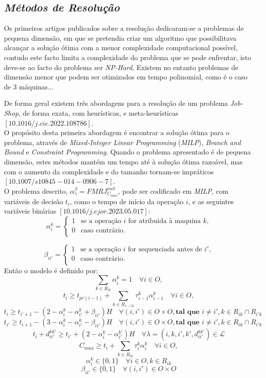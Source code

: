 \subsection{\textit{Métodos de Resolução}}
\label{subsec:MR}

Os primeiros artigos publicados sobre a resolução dedicaram-se a problemas de pequena dimensão, em que se pretendia criar um algoritmo que possibilitava alcançar a solução ótima com a menor complexidade computacional possível, contudo este facto limita a complexidade do problema que se pode enfrentar, isto deve-se ao facto do problema ser \textit{NP-Hard}. Existem no entanto problemas de dimensão menor que podem ser otimizados em tempo polinomial, como é o caso de 3 máquinas...

De forma geral existem três abordagens para a resolução de um problema \textit{Job-Shop}, de forma exata, com heurísticas, e meta-heurísticas $[10.1016/j.cie.2022.108786]$.\\
O propósito desta primeira abordagem é encontrar a solução ótima para o problema, através de \textit{Mixed-Integer Linear Programming} (\textit{MILP}), \textit{Branch and Bound} e \textit{Constraint Programming}. Quando o problema apresentado é de pequena dimensão, estes métodos mantém um tempo até à solução ótima razoável, mas com o aumento da complexidade e do tamanho tornam-se impráticos $[10.1007/s10845-014-0906-7]$.\\
O problema descrito, $\alpha^{\beta}_{\gamma} = FMRJ^{nwt}_{C_{max}}$, pode ser codificado em \textit{MILP}, com variáveis de decisão $t_{i}$, como o tempo de início da operação $i$, e as seguintes variáveis binárias $[10.1016/j.ejor.2023.05.017]$:
$$
\alpha^{k}_{i}=
    \begin{cases}
      1 & \text{se a operação $i$ for atribuida à maquina $k$,}\\
      0 & \text{caso contrário.}\\
    \end{cases}
$$

$$
\beta_{ii'}=
    \begin{cases}
      1 & \text{se a operação $i$ for sequenciada antes de $i'$,}\\
      0 & \text{caso contrário.}\\
    \end{cases}
$$
Então o modelo é definido por:\\
$$\sum_{k \in R_{ik}}\alpha^{k}_{i} = 1 \quad \forall i \in O,$$
$$t_{i} \geq t_{pr(i-1)} + \sum_{k \in R_{i-1k}}\tau^{k}_{i-1}\alpha^{k}_{i-1} \quad \forall i \in O,$$
$$t_{i} \geq t_{i'+1}-(2-\alpha^{k}_{i}-\alpha^{k}_{i'}+\beta_{ii'})H \quad \forall (i,i') \in O\times O, \textbf{tal que } i \neq i', k \in R_{ik} \cap R_{i'k}$$
$$t_{i'} \geq t_{i+1}-(3-\alpha^{k}_{i}-\alpha^{k}_{i'}-\beta_{ii'})H \quad \forall (i,i') \in O\times O, \textbf{tal que } i \neq i', k \in R_{ik} \cap R_{i'k}$$
$$t_{i}+d^{kk'}_{ii'} \geq t_{i'} + (2-\alpha^{k}_{i} - \alpha^{k'}_{i'})H \quad \forall \lambda=(i,k,i',k',d^{kk'}_{ii'}) \in \mathcal{L}$$
$$C_{max} \geq t_{i} + \sum_{k \in R_{ik}}\tau^{k}_{i}\alpha^{k}_{i} \quad \forall i \in O,$$
$$\alpha^{k}_{i} \in \{0,1\} \quad \forall i \in O, k \in R_{ik}$$
$$\beta_{ii'} \in \{0,1\} \quad \forall (i,i') \in O\times O$$

